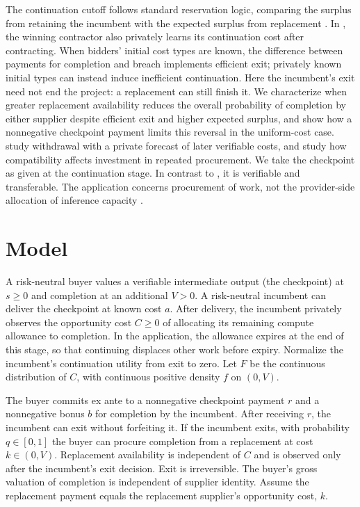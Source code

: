 \documentclass[11pt]{article}
\begin{document}
The continuation cutoff follows standard reservation logic, comparing the surplus from retaining the incumbent with the expected surplus from replacement \citep{das}. In \citet{chillemi}, the winning contractor also privately learns its continuation cost after contracting. When bidders' initial cost types are known, the difference between payments for completion and breach implements efficient exit; privately known initial types can instead induce inefficient continuation. Here the incumbent's exit need not end the project: a replacement can still finish it. We characterize when greater replacement availability reduces the overall probability of completion by either supplier despite efficient exit and higher expected surplus, and show how a nonnegative checkpoint payment limits this reversal in the uniform-cost case. \citet{andrade} study withdrawal with a private forecast of later verifiable costs, and \citet{hanazono} study how compatibility affects investment in repeated procurement. We take the checkpoint as given at the continuation stage. In contrast to \citet{green}, it is verifiable and transferable. The application concerns procurement of work, not the provider-side allocation of inference capacity \citep{zhu}.
\section{Model}
A risk-neutral buyer values a verifiable intermediate output (the checkpoint) at $s\geq 0$ and completion at an additional $V>0$. A risk-neutral incumbent can deliver the checkpoint at known cost $a$. After delivery, the incumbent privately observes the opportunity cost $C\geq 0$ of allocating its remaining compute allowance to completion. In the application, the allowance expires at the end of this stage, so that continuing displaces other work before expiry. Normalize the incumbent's continuation utility from exit to zero. Let $F$ be the continuous distribution of $C$, with continuous positive density $f$ on $(0,V)$.

The buyer commits ex ante to a nonnegative checkpoint payment $r$ and a nonnegative bonus $b$ for completion by the incumbent. After receiving $r$, the incumbent can exit without forfeiting it. If the incumbent exits, with probability $q\in[0,1]$ the buyer can procure completion from a replacement at cost $k\in(0,V)$. Replacement availability is independent of $C$ and is observed only after the incumbent's exit decision. Exit is irreversible. The buyer's gross valuation of completion is independent of supplier identity. Assume the replacement payment equals the replacement supplier's opportunity cost, $k$.
\end{document}
